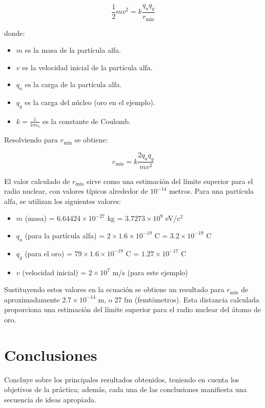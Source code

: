 \documentclass[twocolumn,a4paper,11pt]{scrartcl}
\begin{document}
\[
\frac{1}{2}mv^2 = k\frac{q_a q_g}{r_{\text{min}}}
\]

donde:

\begin{itemize}
    \item $m$ es la masa de la partícula alfa.
    \item $v$ es la velocidad inicial de la partícula alfa.
    \item $q_a$ es la carga de la partícula alfa.
    \item $q_g$ es la carga del núcleo (oro en el ejemplo).
    \item $k = \frac{1}{4\pi\epsilon_0}$ es la constante de Coulomb.
\end{itemize}

Resolviendo para $r_{\text{min}}$ se obtiene:

\[
r_{\text{min}} = k\frac{2q_a q_g}{mv^2}
\]

El valor calculado de $r_{\text{min}}$ sirve como una estimación del límite superior para el radio nuclear, con valores típicos alrededor de $10^{-14}$ metros.
Para una partícula alfa, se utilizan los siguientes valores:

\begin{itemize}
    \item $m$ (masa) = $6.64424 \times 10^{-27}$ kg = $3.7273 \times 10^9$ eV/c$^2$
    \item $q_a$ (para la partícula alfa) = $2 \times 1.6 \times 10^{-19}$ C = $3.2 \times 10^{-19}$ C
    \item $q_g$ (para el oro) = $79 \times 1.6 \times 10^{-19}$ C = $1.27 \times 10^{-17}$ C
    \item $v$ (velocidad inicial) = $2 \times 10^7$ m/s (para este ejemplo)
\end{itemize}

Sustituyendo estos valores en la ecuación se obtiene un resultado para $r_{\text{min}}$ de aproximadamente $2.7 \times 10^{-14}$ m, o 27 fm (femtómetros). Esta distancia calculada proporciona una estimación del límite superior para el radio nuclear del átomo de oro.

\section{Conclusiones}
Concluye sobre los principales resultados obtenidos, teniendo en cuenta los objetivos de la práctica; además, cada una de las conclusiones manifiesta una secuencia de ideas apropiada.



\end{document}

